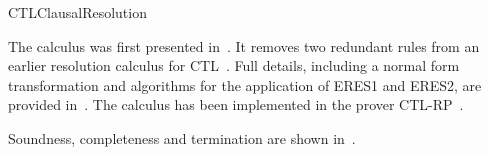 \begin{entry}{CTLClausalResolution}
\begin{history}
  The calculus was first presented
  in~\cite{Zhang+Hustadt+Dixon@CADE2009}.
  It removes two redundant rules from an earlier resolution calculus for
  CTL~\cite{BF99:jetai}.
  Full details, including a normal form transformation and algorithms
  for the application of ERES1 and ERES2, are provided in~\cite{Zhang+Hustadt+Dixon@ToCL2014}. 
  The calculus has been implemented in the prover
  CTL-RP~\cite{Zhang+Hustadt+Dixon@AIC2010}. 
\end{history}

\begin{technicalities}
  Soundness, completeness and termination are shown in~\cite{Zhang+Hustadt+Dixon@ToCL2014}.
\end{technicalities}

\end{entry}
